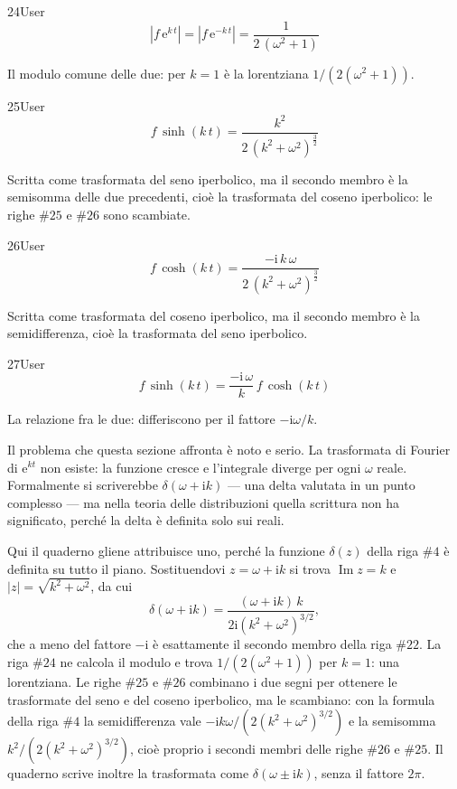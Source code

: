 \begin{espr}{24}{User}{}
\[
\left|f\, \mathrm{e}^{k\, t}\right| = \left|f\, \mathrm{e}^{-k\, t}\right| = \frac{1}{2\, \left(\omega^{2} + 1\right)}
\]
\end{espr}
Il modulo comune delle due: per $k=1$ è la lorentziana $1/\left(2(\omega^2+1)\right)$.

\begin{espr}{25}{User}{}
\[
f\, \sinh\!\left(k\, t\right) = \frac{k^{2}}{2\, \left(k^{2} + \omega^{2}\right)^{\frac{3}{2}}}
\]
\end{espr}
Scritta come trasformata del seno iperbolico, ma il secondo membro è la semisomma delle due precedenti, cioè la trasformata del coseno iperbolico: le righe $\#25$ e $\#26$ sono scambiate.

\begin{espr}{26}{User}{}
\[
f\, \cosh\!\left(k\, t\right) = \frac{-\mathrm{i}\, k\, \omega}{2\, \left(k^{2} + \omega^{2}\right)^{\frac{3}{2}}}
\]
\end{espr}
Scritta come trasformata del coseno iperbolico, ma il secondo membro è la semidifferenza, cioè la trasformata del seno iperbolico.

\begin{espr}{27}{User}{}
\[
f\, \sinh\!\left(k\, t\right) = \frac{-\mathrm{i}\, \omega}{k}\, f\, \cosh\!\left(k\, t\right)
\]
\end{espr}
La relazione fra le due: differiscono per il fattore $-\mathrm{i}\omega/k$.


Il problema che questa sezione affronta è noto e serio. La trasformata di Fourier di $\mathrm{e}^{kt}$ non esiste: la funzione cresce e l'integrale diverge per ogni $\omega$ reale. Formalmente si scriverebbe $\delta(\omega+\mathrm{i}k)$ — una delta valutata in un punto complesso — ma nella teoria delle distribuzioni quella scrittura non ha significato, perché la delta è definita solo sui reali.

Qui il quaderno gliene attribuisce uno, perché la funzione $\delta(z)$ della riga $\#4$ è definita su tutto il piano. Sostituendovi $z=\omega+\mathrm{i}k$ si trova $\operatorname{Im}z=k$ e $|z|=\sqrt{k^2+\omega^2}$, da cui
\[
  \delta(\omega+\mathrm{i}k)=\frac{(\omega+\mathrm{i}k)\,k}{2\mathrm{i}\left(k^2+\omega^2\right)^{3/2}},
\]
che a meno del fattore $-\mathrm{i}$ è esattamente il secondo membro della riga $\#22$. La riga $\#24$ ne calcola il modulo e trova $1/\left(2(\omega^2+1)\right)$ per $k=1$: una lorentziana. Le righe $\#25$ e $\#26$ combinano i due segni per ottenere le trasformate del seno e del coseno iperbolico, ma le scambiano: con la formula della riga $\#4$ la semidifferenza vale $-\mathrm{i}k\omega/\left(2(k^2+\omega^2)^{3/2}\right)$ e la semisomma $k^2/\left(2(k^2+\omega^2)^{3/2}\right)$, cioè proprio i secondi membri delle righe $\#26$ e $\#25$. Il quaderno scrive inoltre la trasformata come $\delta(\omega\pm\mathrm{i}k)$, senza il fattore $2\pi$.


